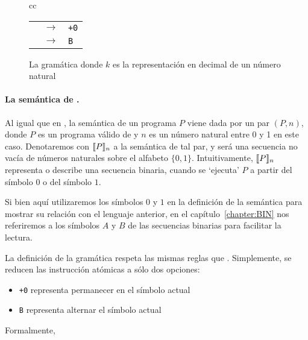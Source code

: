 \begin{figure}
\begin{center}
\begin{tabular}{cc}
\begin{minipage}[t]{0.35\textwidth}
    \medskip

    \begin{tabular}{rcl}    \\
    \atom  & $\to$ & \verb#+0# %
    \\
    \atom  & $\to$ & \verb#B # %
    \end{tabular}
    \end{minipage}
\end{tabular}
\end{center}
\caption{La gramática \grambin donde $k$ es la representación en decimal de un número natural}
\label{fig:grambin}
\end{figure}

\paragraph{La semántica de \grambin.}

Al igual que en \grambin, la semántica de un programa $P$ viene dada por un par $(P,n)$, donde $P$ es un programa válido de \grambin y $n$ es un número natural entre 0 y 1 en este caso. Denotaremos con $\llbracket P\rrbracket_n$ a la semántica de tal par, y será una secuencia no vacía de números naturales sobre el alfabeto $\{0,1\}$. Intuitivamente, $\llbracket P\rrbracket_n$ representa o describe una secuencia binaria, cuando se `ejecuta' $P$ a partir del símbolo $0$ o del símbolo $1$. 

Si bien aquí utilizaremos los símbolos $0$ y $1$ en la definición de la semántica para mostrar su relación con el lenguaje anterior, en el capítulo~\ref{chapter:BIN} nos referiremos a los símbolos $A$ y $B$ de las secuencias binarias para facilitar la lectura.

La definición de la gramática \grambin respeta las mismas reglas que \gramgeo. Simplemente, se reducen las instrucción atómicas a sólo dos opciones: 
\begin{itemize}

\item \verb#+0# representa permanecer en el símbolo actual

\item \verb#B# representa alternar el símbolo actual 

\end{itemize}

Formalmente, 

